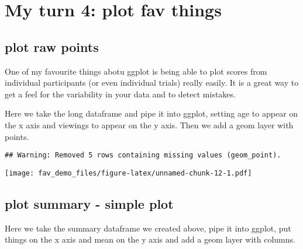 \documentclass[]{article}
\newenvironment{Shaded}{\begin{snugshade}}{\end{snugshade}}
\newcommand{\DataTypeTok}[1]{\textcolor[rgb]{0.13,0.29,0.53}{#1}}
\newcommand{\KeywordTok}[1]{\textcolor[rgb]{0.13,0.29,0.53}{\textbf{#1}}}
\newcommand{\NormalTok}[1]{#1}
\newcommand{\OperatorTok}[1]{\textcolor[rgb]{0.81,0.36,0.00}{\textbf{#1}}}
\newcommand{\StringTok}[1]{\textcolor[rgb]{0.31,0.60,0.02}{#1}}
\begin{document}
\hypertarget{my-turn-4-plot-fav-things}{%
\section{My turn 4: plot fav things}\label{my-turn-4-plot-fav-things}}

\hypertarget{plot-raw-points}{%
\subsection{plot raw points}\label{plot-raw-points}}

One of my favourite things abotu ggplot is being able to plot scores
from individual participants (or even individual trials) really easily.
It is a great way to get a feel for the variability in your data and to
detect mistakes.

Here we take the long dataframe and pipe it into ggplot, setting age to
appear on the x axis and viewings to appear on the y axis. Then we add a
geom layer with points.

\begin{Shaded}
\end{Shaded}

\begin{verbatim}
## Warning: Removed 5 rows containing missing values (geom_point).
\end{verbatim}

\texttt{[image: fav\_demo\_files/figure-latex/unnamed-chunk-12-1.pdf]}

\hypertarget{plot-summary---simple-plot}{%
\subsection{plot summary - simple
plot}\label{plot-summary---simple-plot}}

Here we take the summary dataframe we created above, pipe it into
ggplot, put things on the x axis and mean on the y axis and add a geom
layer with columns.

\begin{Shaded}
\end{Shaded}
\end{document}
